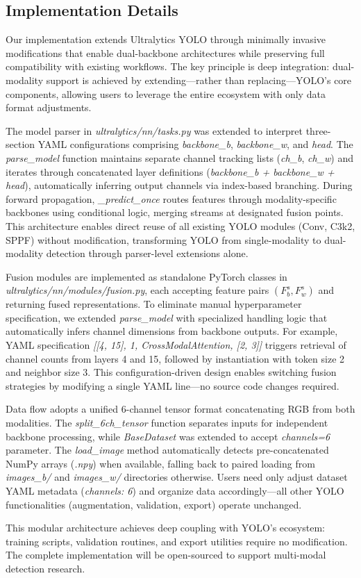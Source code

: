 \subsection{Implementation Details}

Our implementation extends Ultralytics YOLO through minimally invasive modifications that enable dual-backbone architectures while preserving full compatibility with existing workflows. The key principle is deep integration: dual-modality support is achieved by extending—rather than replacing—YOLO's core components, allowing users to leverage the entire ecosystem with only data format adjustments.

The model parser in \textit{ultralytics/nn/tasks.py} was extended to interpret three-section YAML configurations comprising \textit{backbone\_b}, \textit{backbone\_w}, and \textit{head}. The \textit{parse\_model} function maintains separate channel tracking lists (\textit{ch\_b}, \textit{ch\_w}) and iterates through concatenated layer definitions (\textit{backbone\_b + backbone\_w + head}), automatically inferring output channels via index-based branching. During forward propagation, \textit{\_predict\_once} routes features through modality-specific backbones using conditional logic, merging streams at designated fusion points. This architecture enables direct reuse of all existing YOLO modules (Conv, C3k2, SPPF) without modification, transforming YOLO from single-modality to dual-modality detection through parser-level extensions alone.

Fusion modules are implemented as standalone PyTorch classes in \textit{ultralytics/nn/modules/fusion.py}, each accepting feature pairs $(F_b^s, F_w^s)$ and returning fused representations. To eliminate manual hyperparameter specification, we extended \textit{parse\_model} with specialized handling logic that automatically infers channel dimensions from backbone outputs. For example, YAML specification \textit{[[4, 15], 1, CrossModalAttention, [2, 3]]} triggers retrieval of channel counts from layers 4 and 15, followed by instantiation with token size 2 and neighbor size 3. This configuration-driven design enables switching fusion strategies by modifying a single YAML line—no source code changes required.

Data flow adopts a unified 6-channel tensor format concatenating RGB from both modalities. The \textit{split\_6ch\_tensor} function separates inputs for independent backbone processing, while \textit{BaseDataset} was extended to accept \textit{channels=6} parameter. The \textit{load\_image} method automatically detects pre-concatenated NumPy arrays (\textit{.npy}) when available, falling back to paired loading from \textit{images\_b/} and \textit{images\_w/} directories otherwise. Users need only adjust dataset YAML metadata (\textit{channels: 6}) and organize data accordingly—all other YOLO functionalities (augmentation, validation, export) operate unchanged.

This modular architecture achieves deep coupling with YOLO's ecosystem: training scripts, validation routines, and export utilities require no modification. The complete implementation will be open-sourced to support multi-modal detection research.